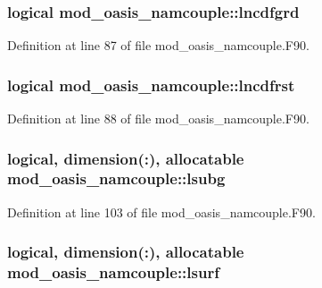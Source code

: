 \hypertarget{classmod__oasis__namcouple_a5d6add8b958acc8b865b898d9e54ac73}{
\subsubsection[{lncdfgrd}]{\setlength{\rightskip}{0pt plus 5cm}logical mod\+\_\+oasis\+\_\+namcouple\+::lncdfgrd\hspace{0.3cm}{\ttfamily [private]}}}\label{classmod__oasis__namcouple_a5d6add8b958acc8b865b898d9e54ac73}


Definition at line 87 of file mod\+\_\+oasis\+\_\+namcouple.\+F90.

\hypertarget{classmod__oasis__namcouple_a645168dae20a0c24786c3e6dcea9f2ab}{
\subsubsection[{lncdfrst}]{\setlength{\rightskip}{0pt plus 5cm}logical mod\+\_\+oasis\+\_\+namcouple\+::lncdfrst\hspace{0.3cm}{\ttfamily [private]}}}\label{classmod__oasis__namcouple_a645168dae20a0c24786c3e6dcea9f2ab}


Definition at line 88 of file mod\+\_\+oasis\+\_\+namcouple.\+F90.

\hypertarget{classmod__oasis__namcouple_acda1605129987d656360e1ed81e8d199}{
\subsubsection[{lsubg}]{\setlength{\rightskip}{0pt plus 5cm}logical, dimension(\+:), allocatable mod\+\_\+oasis\+\_\+namcouple\+::lsubg\hspace{0.3cm}{\ttfamily [private]}}}\label{classmod__oasis__namcouple_acda1605129987d656360e1ed81e8d199}


Definition at line 103 of file mod\+\_\+oasis\+\_\+namcouple.\+F90.

\hypertarget{classmod__oasis__namcouple_a902fe007f6c2505858bf72dbc64e43a2}{
\subsubsection[{lsurf}]{\setlength{\rightskip}{0pt plus 5cm}logical, dimension(\+:), allocatable mod\+\_\+oasis\+\_\+namcouple\+::lsurf\hspace{0.3cm}{\ttfamily [private]}}}\label{classmod__oasis__namcouple_a902fe007f6c2505858bf72dbc64e43a2}


